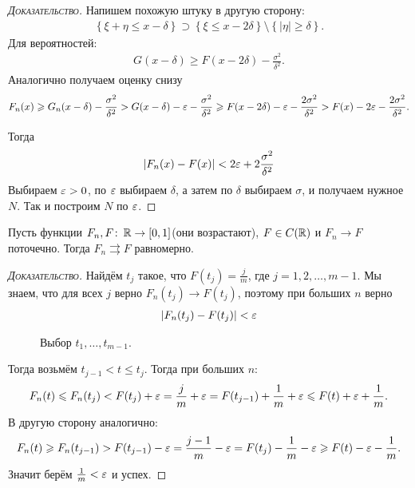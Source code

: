 \documentclass[../main.tex]{subfiles}
\begin{document}
\begin{proof}[\normalfont\textsc{Доказательство}]
 Напишем похожую штуку в другую сторону:
 \begin{align*}
  \left\{ \xi +\eta \leqslant x - \delta \right\} \supset \left\{ \xi \leqslant x - 2\delta \right\} \setminus \left\{ \left| \eta \right| \geqslant \delta \right\}.
 \end{align*} Для вероятностей:
 \begin{align*}
  G(x-\delta) \geqslant F(x - 2\delta) - \frac{\sigma^{2}}{\delta^{2}}.
 \end{align*}  Аналогично получаем оценку снизу 
 \begin{align*}
  F_n(x) \geqslant G_n(x - \delta) - \frac{\sigma^{2}}{\delta^{2}} > G(x-\delta) - \varepsilon - \frac{\sigma^{2}}{\delta^{2}} \geqslant F(x - 2\delta) - \varepsilon - \frac{2\sigma^{2}}{\delta^{2}}  > F(x) - 2\varepsilon - \frac{2\sigma^{2}}{\delta^{2}}.
 \end{align*}

 Тогда
 \begin{align*}
  \left| F_n(x) - F(x) \right| < 2\varepsilon + 2 \frac{\sigma^{2}}{\delta^{2}}
 \end{align*} Выбираем $ \varepsilon > 0$, по $ \varepsilon $ выбираем $ \delta $,  а затем по $ \delta $ выбираем $ \sigma $, и получаем нужное $ N $. Так и построим $ N $ по $ \varepsilon $.

\end{proof}

\begin{thm}
 Пусть функции $ F_n, F \colon\, \mathbb{R} \to [0,1] $(они возрастают), $ F \in C(\mathbb{R}) $ и $ F_n \to F $ поточечно. Тогда $ F_n \rightrightarrows F $ равномерно.
\end{thm}
\begin{proof}[\normalfont\textsc{Доказательство}]
 Найдём $ t_j $ такое, что $ F(t_j) = \frac{j}{m} $, где $ j = 1, 2, \ldots, m - 1 $. Мы знаем, что для всех $ j $ верно $ F_n(t_j) \to F(t_j) $, поэтому при больших $ n $ верно
 \begin{align*}
  \left| F_n(t_j) - F(t_j) \right| < \varepsilon
 \end{align*}

\begin{figure}[ht]
    \centering
	\caption{Выбор $t_1, \dots, t_{m-1}$. }
    \label{fig:distribution_function_points_to_evenlly}
\end{figure}

 Тогда возьмём $ t_{j-1} < t \leqslant t_j $. Тогда при больших $ n $:
 \begin{align*}
  F_n(t) \leqslant F_n(t_j) < F(t_j) + \varepsilon = \frac{j}{m} + \varepsilon = F(t_{j-1}) + \frac{1}{m} + \varepsilon \leqslant F(t) + \varepsilon + \frac{1}{m}.
 \end{align*} В другую сторону аналогично:
 \begin{align*}
  F_n(t) \geqslant F_n(t_{j-1}) > F(t_{j-1}) - \varepsilon = \frac{j-1}{m} - \varepsilon = F(t_j) - \frac{1}{m} - \varepsilon \geqslant F(t) - \varepsilon - \frac{1}{m}.
 \end{align*} Значит берём $ \frac{1}{m} < \varepsilon $ и успех.
\end{proof}
\end{document}
